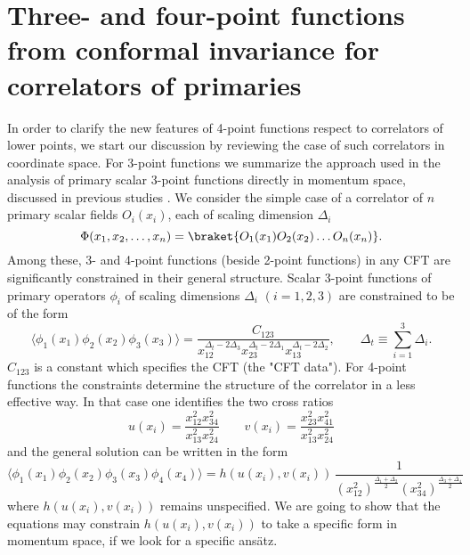 \documentclass[a4paper,11pt,openright,twoside]{book}
\numberwithin{equation}{section}
\begin{document}
{\section{Three- and four-point functions from conformal invariance for correlators of primaries}
In order to clarify the new features of 4-point functions respect to correlators of lower points, we start our discussion by reviewing the case of such correlators in coordinate space. For 3-point functions we summarize the approach used in the analysis of primary scalar 3-point functions directly in momentum space, discussed in previous studies \cite{Coriano:2013jba}.
We consider the simple case of a correlator of $n$ primary scalar fields $O_i(x_i)$, each of scaling dimension $\Delta_i$
\begin{equation}
	\label{defop}
	\Phi(x_1,x_2,\ldots,x_n)=\braket{O_1(x_1)O_2(x_2)\ldots O_n(x_n)}.
\end{equation}
Among these, 3- and 4-point functions (beside 2-point functions) in any CFT are significantly constrained in their general structure. Scalar 3-point functions of primary operators $\phi_i$ of scaling dimensions 
$\Delta_i$ $(i=1,2,3)$ are constrained to be of the form
\begin{equation}
	\label{corr}
	\langle \phi_1(x_1)\phi_2(x_2)\phi_3(x_3)\rangle =\frac{C_{123}}{ x_{12}^{\Delta_t - 2 \Delta_3}  x_{23}^{\Delta_t - 2 \Delta_1}x_{13}^{\Delta_t - 2 \Delta_2} },\qquad \Delta_t\equiv \sum_{i=1}^3 \Delta_i.
\end{equation}
$C_{123}$ is a constant which specifies the CFT (the "CFT data"). For 4-point functions the constraints determine the structure of the correlator in a less effective way. In that case one identifies the two cross ratios 
\begin{equation}
	\label{uv}
	u(x_i)=\frac{x_{12}^2 x_{34}^2}{x_{13}^2 x_{24}^2} \qquad v(x_i)=\frac{x_{23}^2 x_{41}^2}{x_{13}^2 x_{24}^2}
\end{equation}
and the general solution can be written in the form 
\begin{equation}
	\label{general}
	\langle \phi_1(x_1)\phi_2(x_2)\phi_3(x_3)\phi_4(x_4)\rangle= h(u(x_i),v(x_i))\, \frac{1}{\left(x_{12}^2\right)^\frac{\Delta_1 + \Delta_2}{2}\left(x_{3 4}^2\right)^\frac{\Delta_3 + \Delta_4}{2}}
\end{equation}
where $h(u(x_i),v(x_i))$ remains unspecified. We are going to show that the equations may constrain $h(u(x_i),v(x_i))$ to take a specific form in momentum space, if we look for a specific ans\"atz.

}
\end{document}
